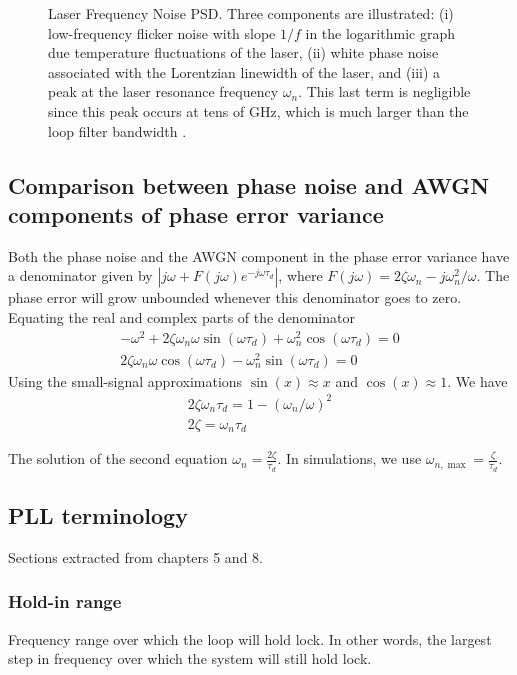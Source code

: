 \documentclass[a4paper]{article}
\begin{document}
\begin{figure} [!t]
	\centering
	
	\caption{Laser Frequency Noise PSD. Three components are illustrated: (i) low-frequency flicker noise with slope $1/f$ in the logarithmic graph due temperature fluctuations of the laser, (ii) white phase noise associated with the Lorentzian linewidth of the laser, and (iii) a peak at the laser resonance frequency $\omega_n$. This last term is negligible since this peak occurs at tens of GHz, which is much larger than the loop filter bandwidth \cite{Kazovsky1986}.} \label{fig:freq_noise_psd}
\end{figure}

\subsection{Comparison between phase noise and AWGN components of phase error variance}

Both the phase noise and the AWGN component in the phase error variance have a denominator given by $|j\omega + F(j\omega)e^{-j\omega\tau_d}|$, where $F(j\omega) = 2\zeta\omega_n - j\omega_n^2/\omega$. The phase error will grow unbounded whenever this denominator goes to zero. Equating the real and complex parts of the denominator
\begin{align}
-\omega^2 + 2\zeta\omega_n\omega\sin(\omega\tau_d) + \omega_n^2\cos(\omega\tau_d) = 0 \\
2\zeta\omega_n\omega\cos(\omega\tau_d) - \omega_n^2\sin(\omega\tau_d) = 0
\end{align}
Using the small-signal approximations $\sin(x)\approx x$ and $\cos(x) \approx 1$. We have
\begin{align}
2\zeta\omega_n\tau_d = 1 - (\omega_n/\omega)^2 \\
2\zeta = \omega_n\tau_d
\end{align}

The solution of the second equation $\omega_n = \frac{2\zeta}{\tau_d}$. In simulations, we use $\omega_{n, \max} = \frac{\zeta}{\tau_d}$.


\subsection{PLL terminology}
Sections extracted from \cite{Gardner} chapters 5 and 8. 

\subsubsection{Hold-in range}
Frequency range over which the loop will hold lock. In other words, the largest step in frequency over which the system will still hold lock.	
\end{document}
